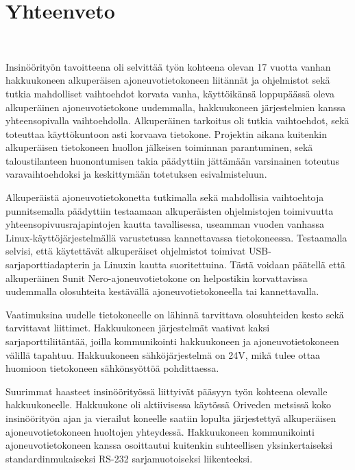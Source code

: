 


\newpage

\chapter{Yhteenveto}\

Insinöörityön tavoitteena oli selvittää työn kohteena olevan 17 vuotta vanhan hakkuukoneen alkuperäisen ajoneuvotietokoneen liitännät ja ohjelmistot sekä tutkia mahdolliset vaihtoehdot korvata vanha, käyttöikänsä loppupäässä oleva alkuperäinen ajoneuvotietokone uudemmalla, hakkuukoneen järjestelmien kanssa yhteensopivalla vaihtoehdolla. Alkuperäinen tarkoitus oli tutkia vaihtoehdot, sekä toteuttaa käyttökuntoon asti korvaava tietokone. Projektin aikana kuitenkin alkuperäisen tietokoneen huollon jälkeisen toiminnan parantuminen, sekä taloustilanteen huonontumisen takia päädyttiin jättämään varsinainen toteutus varavaihtoehdoksi ja keskittymään totetuksen esivalmisteluun.

Alkuperäistä ajoneuvotietokonetta tutkimalla sekä mahdollisia vaihtoehtoja punnitsemalla päädyttiin testaamaan alkuperäisten ohjelmistojen toimivuutta yhteensopivuusrajapintojen kautta tavallisessa, useamman vuoden vanhassa Linux-käyttöjärjestelmällä varustetussa kannettavassa tietokoneessa. Testaamalla selvisi, että käytettävät alkuperäiset ohjelmistot toimivat USB-sarjaporttiadapterin ja Linuxin kautta suoritettuina. Tästä voidaan päätellä että alkuperäinen Sunit Nero-ajoneuvotietokone on helpostikin korvattavissa uudemmalla olosuhteita kestävällä ajoneuvotietokoneella tai kannettavalla.

Vaatimuksina uudelle tietokoneelle on lähinnä tarvittava olosuhteiden kesto sekä tarvittavat liittimet. Hakkuukoneen järjestelmät vaativat kaksi sarjaporttiliitäntää, joilla kommunikointi hakkuukoneen ja ajoneuvotietokoneen välillä tapahtuu. Hakkuukoneen sähköjärjestelmä on 24V, mikä tulee ottaa huomioon tietokoneen sähkönsyöttöä pohdittaessa.

Suurimmat haasteet insinöörityössä liittyivät pääsyyn työn kohteena olevalle hakkuukoneelle. Hakkuukone oli aktiivisessa käytössä Oriveden metsissä koko insinöörityön ajan ja vierailut koneelle saatiin lopulta järjestettyä alkuperäisen ajoneuvotietokoneen huoltojen yhteydessä. Hakkuukoneen kommunikointi ajoneuvotietokoneen kanssa osoittautui kuitenkin suhteellisen yksinkertaiseksi standardinmukaiseksi RS-232 sarjamuotoiseksi liikenteeksi.

